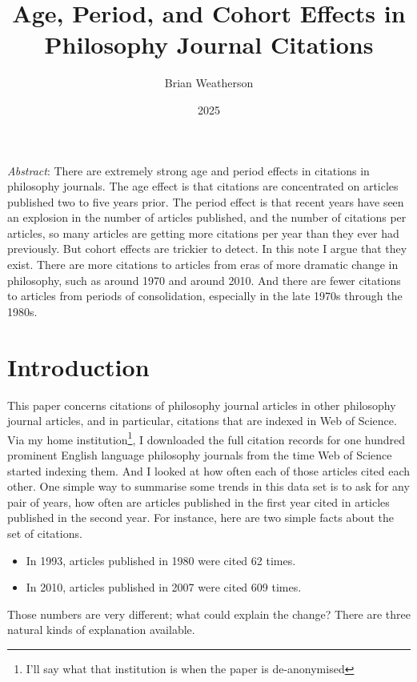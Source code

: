 \documentclass[
  11pt,
  letterpaper,
  DIV=11,
  numbers=noendperiod,
  twoside]{scrartcl}
\title{Age, Period, and Cohort Effects in Philosophy Journal Citations}
\author{Brian Weatherson}
\date{2025}
\providecommand{\tightlist}{%
  \setlength{\itemsep}{0pt}\setlength{\parskip}{0pt}}\usepackage{longtable,booktabs,array}
\renewenvironment{abstract}
 {\vspace{-1.25cm}
 \quotation\small\noindent\emph{Abstract}:}
 {\endquotation}
\begin{document}
\maketitle
\begin{abstract}
There are extremely strong age and period effects in citations in
philosophy journals. The age effect is that citations are concentrated
on articles published two to five years prior. The period effect is that
recent years have seen an explosion in the number of articles published,
and the number of citations per articles, so many articles are getting
more citations per year than they ever had previously. But cohort
effects are trickier to detect. In this note I argue that they exist.
There are more citations to articles from eras of more dramatic change
in philosophy, such as around 1970 and around 2010. And there are fewer
citations to articles from periods of consolidation, especially in the
late 1970s through the 1980s.
\end{abstract}


\section{Introduction}\label{sec-introduction}

This paper concerns citations of philosophy journal articles in other
philosophy journal articles, and in particular, citations that are
indexed in Web of Science. Via my home institution\footnote{I'll say
  what that institution is when the paper is de-anonymised}, I
downloaded the full citation records for one hundred prominent English
language philosophy journals from the time Web of Science started
indexing them. And I looked at how often each of those articles cited
each other. One simple way to summarise some trends in this data set is
to ask for any pair of years, how often are articles published in the
first year cited in articles published in the second year. For instance,
here are two simple facts about the set of citations.

\begin{itemize}
\tightlist
\item
  In 1993, articles published in 1980 were cited 62 times.
\item
  In 2010, articles published in 2007 were cited 609 times.
\end{itemize}

Those numbers are very different; what could explain the change? There
are three natural kinds of explanation available.
\end{document}
